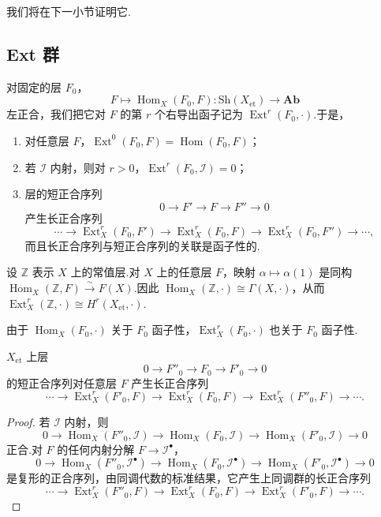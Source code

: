 我们将在下一小节证明它.

\subsection*{Ext 群}

对固定的层 $F_0$，
\[
F \mapsto \operatorname{Hom}_X(F_0, F) \colon \mathrm{Sh}(X_{\mathrm{et}}) \to \mathbf{Ab}
\]
左正合，我们把它对 $F$ 的第 $r$ 个右导出函子记为 $\operatorname{Ext}^{r}(F_0, \cdot)$.于是，
\begin{enumerate}
  \item 对任意层 $F$，$\operatorname{Ext}^{0}(F_0, F) = \operatorname{Hom}(F_0, F)$；
  \item 若 $\mathcal{I}$ 内射，则对 $r > 0$，$\operatorname{Ext}^{r}(F_0, \mathcal{I}) = 0$；
  \item 层的短正合序列
  \[
  0 \to F' \to F \to F'' \to 0
  \]
  产生长正合序列
  \[
  \cdots \to \operatorname{Ext}^{r}_{X}(F_0, F') \to \operatorname{Ext}^{r}_{X}(F_0, F) \to \operatorname{Ext}^{r}_{X}(F_0, F'') \to \cdots,
  \]
  而且长正合序列与短正合序列的关联是函子性的.
\end{enumerate}

\begin{example}\label{ex:9.5}
设 $\mathbb{Z}$ 表示 $X$ 上的常值层.对 $X$ 上的任意层 $F$，映射 $\alpha \mapsto \alpha(1)$ 是同构 $\operatorname{Hom}_X(\mathbb{Z}, F) \xrightarrow{\sim} F(X)$.因此 $\operatorname{Hom}_X(\mathbb{Z}, \cdot) \cong \Gamma(X, \cdot)$，从而 $\operatorname{Ext}^{r}_{X}(\mathbb{Z}, \cdot) \cong H^{r}(X_{\mathrm{et}}, \cdot)$.

由于 $\operatorname{Hom}_X(F_0, \cdot)$ 关于 $F_0$ 函子性，$\operatorname{Ext}^{r}_{X}(F_0, \cdot)$ 也关于 $F_0$ 函子性.
\end{example}

\begin{proposition}\label{prop:9.6}
$X_{\mathrm{et}}$ 上层
\[
0 \to F''_0 \to F_0 \to F'_0 \to 0
\]
的短正合序列对任意层 $F$ 产生长正合序列
\[
\cdots \to \operatorname{Ext}^{r}_{X}(F'_0, F) \to \operatorname{Ext}^{r}_{X}(F_0, F) \to \operatorname{Ext}^{r}_{X}(F''_0, F) \to \cdots.
\]
\end{proposition}

\begin{proof}
若 $\mathcal{I}$ 内射，则
\[
0 \to \operatorname{Hom}_X(F''_0, \mathcal{I}) \to \operatorname{Hom}_X(F_0, \mathcal{I}) \to \operatorname{Hom}_X(F'_0, \mathcal{I}) \to 0
\]
正合.对 $F$ 的任何内射分解 $F \to \mathcal{I}^{\bullet}$，
\[
0 \to \operatorname{Hom}_X(F''_0, \mathcal{I}^{\bullet}) \to \operatorname{Hom}_X(F_0, \mathcal{I}^{\bullet}) \to \operatorname{Hom}_X(F'_0, \mathcal{I}^{\bullet}) \to 0
\]
是复形的正合序列，由同调代数的标准结果，它产生上同调群的长正合序列
\[
\cdots \to \operatorname{Ext}^{r}_{X}(F''_0, F) \to \operatorname{Ext}^{r}_{X}(F_0, F) \to \operatorname{Ext}^{r}_{X}(F'_0, F) \to \cdots.
\]
\end{proof}

